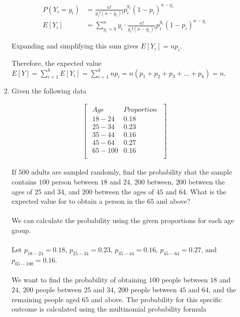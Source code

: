\documentclass{article}
\begin{document}
\begin{enumerate}
\begin{enumerate}[label=1.\arabic*]
		            \begin{align}
			            P(Y_i = y_i) & = \frac{n!}{y_i!(n - y_i)!}p_i^{y_i}(1 - p_i)^{n - y_i}                              \\
			            E[Y_i]       & = \sum_{y_i = 0}^{n} y_i \cdot \frac{n!}{y_i!(n - y_i)!}p_i^{y_i}(1 - p_i)^{n - y_i}
		            \end{align}

		            Expanding and simplifying this sum gives $E[Y_i] = np_i$.

		            Therefore, the expected value $E[Y] = \sum_{i=1}^{k} E[Y_i] = \sum_{i=1}^{k}np_i = n(p_1 + p_2 + p_3 + ... + p_k) = n$.

		      \item Given the following data

		            \begin{gather*}
			            \begin{bmatrix}
				            \begin{array}{c|c}
					            Age    & Proportion \\
					            18-24  & 0.18       \\
					            25-34  & 0.23       \\
					            35-44  & 0.16       \\
					            45-64  & 0.27       \\
					            65-100 & 0.16       \\
				            \end{array}
			            \end{bmatrix}
		            \end{gather*}

		            If $500$ adults are sampled  randomly, find the probability rhat the sample contains $100$ person between $18$ and $24$, $200$ between, $200$ between the ages of $25$ and $34$, and $200$ between the ages of $45$ and $64$. What is the expected value for to obtain a person in the $65$ and above?
		            \\~\\
		            We can calculate the probability using the given proportions for each age group.
		            \\~\\
		            Let $p_{18-24} = 0.18$, $p_{25-34} = 0.23$, $p_{35-44} = 0.16$, $p_{45-64} = 0.27$, and $p_{65-100} = 0.16$.
		            \\~\\
		            We want to find the probability of obtaining $100$ people between $18$ and $24$, $200$ people between $25$ and $34$, $200$ people between $45$ and $64$, and the remaining people aged $65$ and above.
		            The probability for this specific outcome is calculated using the multinomial probability formula


\end{enumerate}
\end{enumerate}
\end{document}
